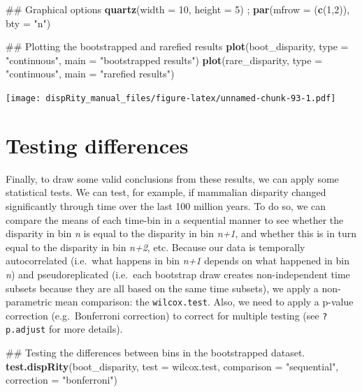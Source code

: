\documentclass[]{book}
\newenvironment{Shaded}{\begin{snugshade}}{\end{snugshade}}
\newcommand{\KeywordTok}[1]{\textcolor[rgb]{0.13,0.29,0.53}{\textbf{#1}}}
\newcommand{\DataTypeTok}[1]{\textcolor[rgb]{0.13,0.29,0.53}{#1}}
\newcommand{\DecValTok}[1]{\textcolor[rgb]{0.00,0.00,0.81}{#1}}
\newcommand{\StringTok}[1]{\textcolor[rgb]{0.31,0.60,0.02}{#1}}
\newcommand{\NormalTok}[1]{#1}
\theoremstyle{definition}
\theoremstyle{definition}
\theoremstyle{remark}
\begin{document}
\begin{Shaded}
\begin{Highlighting}[]
\NormalTok{## Graphical options}
\KeywordTok{quartz}\NormalTok{(}\DataTypeTok{width =} \DecValTok{10}\NormalTok{, }\DataTypeTok{height =} \DecValTok{5}\NormalTok{) ; }\KeywordTok{par}\NormalTok{(}\DataTypeTok{mfrow =}\NormalTok{ (}\KeywordTok{c}\NormalTok{(}\DecValTok{1}\NormalTok{,}\DecValTok{2}\NormalTok{)), }\DataTypeTok{bty =} \StringTok{"n"}\NormalTok{)}

\NormalTok{## Plotting the bootstrapped and rarefied results}
\KeywordTok{plot}\NormalTok{(boot_disparity, }\DataTypeTok{type =} \StringTok{"continuous"}\NormalTok{, }\DataTypeTok{main =} \StringTok{"bootstrapped results"}\NormalTok{)}
\KeywordTok{plot}\NormalTok{(rare_disparity, }\DataTypeTok{type =} \StringTok{"continuous"}\NormalTok{, }\DataTypeTok{main =} \StringTok{"rarefied results"}\NormalTok{)}
\end{Highlighting}
\end{Shaded}

\texttt{[image: dispRity\_manual\_files/figure-latex/unnamed-chunk-93-1.pdf]}

\section{Testing differences}\label{testing-differences}

Finally, to draw some valid conclusions from these results, we can apply
some statistical tests. We can test, for example, if mammalian disparity
changed significantly through time over the last 100 million years. To
do so, we can compare the means of each time-bin in a sequential manner
to see whether the disparity in bin \emph{n} is equal to the disparity
in bin \emph{n+1}, and whether this is in turn equal to the disparity in
bin \emph{n+2}, etc. Because our data is temporally autocorrelated
(i.e.~what happens in bin \emph{n+1} depends on what happened in bin
\emph{n}) and pseudoreplicated (i.e.~each bootstrap draw creates
non-independent time subsets because they are all based on the same time
subsets), we apply a non-parametric mean comparison: the
\texttt{wilcox.test}. Also, we need to apply a p-value correction
(e.g.~Bonferroni correction) to correct for multiple testing (see
\texttt{?p.adjust} for more details).

\begin{Shaded}
\begin{Highlighting}[]
\NormalTok{## Testing the differences between bins in the bootstrapped dataset.}
\KeywordTok{test.dispRity}\NormalTok{(boot_disparity, }\DataTypeTok{test =}\NormalTok{ wilcox.test, }\DataTypeTok{comparison =} \StringTok{"sequential"}\NormalTok{,}
    \DataTypeTok{correction =} \StringTok{"bonferroni"}\NormalTok{)}
\end{Highlighting}
\end{Shaded}
\end{document}
